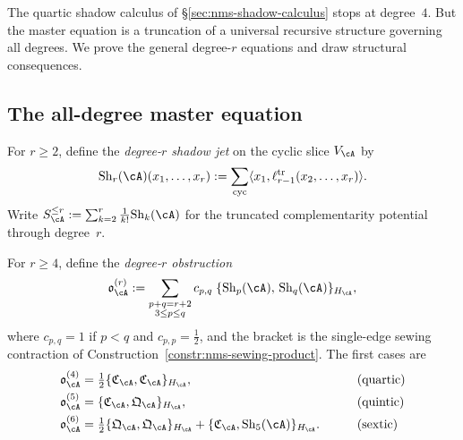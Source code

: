 The quartic shadow calculus of \S\ref{sec:nms-shadow-calculus} stops at degree~$4$. But the master equation is a truncation of a universal recursive structure governing all degrees. We prove the general degree-$r$ equations and draw structural consequences.

\subsection{The all-degree master equation}
\label{subsec:nms-all-degree-master-equation}

\begin{definition}
\label{def:nms-degree-r-shadow-jet}
For $r\ge 2$, define the \emph{degree-$r$ shadow jet} on the cyclic slice $V_{\cA}$ by
\begin{equation}
\label{eq:nms-degree-r-shadow-jet}
\mathrm{Sh}_r(\cA)(x_1,\dots,x_r)
:=
\sum_{\mathrm{cyc}}\langle x_1,\ell_{r-1}^{\mathrm{tr}}(x_2,\dots,x_r)\rangle.
\end{equation}
Write $S_{\cA}^{\le r}:=\sum_{k=2}^r \frac{1}{k!}\mathrm{Sh}_k(\cA)$ for the truncated complementarity potential through degree~$r$.
\end{definition}

\begin{definition}
\label{def:nms-degree-r-obstruction}
For $r\ge 4$, define the \emph{degree-$r$ obstruction}
\begin{equation}
\label{eq:nms-degree-r-obstruction}
\mathfrak o_{\cA}^{(r)}
:=
\sum_{\substack{p+q=r+2 \\ 3\le p\le q}}
c_{p,q}\;
\{\mathrm{Sh}_p(\cA),\,\mathrm{Sh}_q(\cA)\}_{H_{\cA}},
\end{equation}
where $c_{p,q}=1$ if $p<q$ and $c_{p,p}=\frac12$, and the bracket is the single-edge sewing contraction of Construction~\ref{constr:nms-sewing-product}. The first cases are
\begin{alignat}{2}
\mathfrak o_{\cA}^{(4)}
&= \tfrac12\{\mathfrak C_{\cA},\mathfrak C_{\cA}\}_{H_{\cA}},
&\qquad&\text{(quartic)}
\label{eq:nms-quartic-obstruction-recalled}
\\
\mathfrak o_{\cA}^{(5)}
&= \{\mathfrak C_{\cA},\mathfrak Q_{\cA}\}_{H_{\cA}},
&\qquad&\text{(quintic)}
\label{eq:nms-quintic-obstruction}
\\
\mathfrak o_{\cA}^{(6)}
&= \tfrac12\{\mathfrak Q_{\cA},\mathfrak Q_{\cA}\}_{H_{\cA}}
+\{\mathfrak C_{\cA},\mathrm{Sh}_5(\cA)\}_{H_{\cA}}.
&\qquad&\text{(sextic)}
\label{eq:nms-sextic-obstruction}
\end{alignat}
\end{definition}

